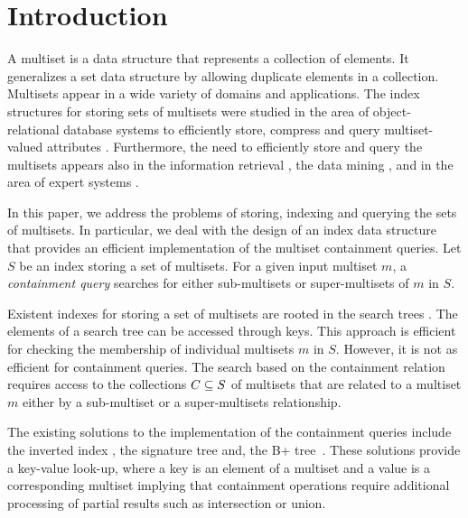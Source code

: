 \section{Introduction} \label{c:introduction}
%
%
A multiset is a data structure that represents a collection of elements. It generalizes a set data structure by allowing duplicate elements in a collection. Multisets appear in a wide variety of domains and applications. The index structures for storing sets of multisets were studied in the area of object-relational database systems to efficiently store, compress and query multiset-valued attributes \cite{bouros2016set,gripon2012compressing,ross2004symmetric,steinruecken2015compressing}. Furthermore, the need to efficiently store and query the multisets appears also in the information retrieval \cite{manning2008introduction,baeza1999modern}, the data mining \cite{mannila1997}, and in the area of expert systems \cite{forgy1982,inbook}. 
%

In this paper, we address the problems of storing, indexing and querying the sets of multisets. In particular, we deal with the design of an index data structure that provides an efficient implementation of the multiset containment queries. Let $S$ be an index storing a set of multisets. For a given input multiset $m$, a \emph{containment query} searches for either sub-multisets or super-multisets of $m$ in $S$. 

Existent indexes for storing a set of multisets are rooted in the search trees \cite{corman2001}. The elements of a search tree can be accessed through keys. This approach is efficient for checking the membership of individual multisets $m$ in $S$. However, it is not as efficient for  containment queries. The search based on the containment relation requires access to the collections $C\subseteq\/S$ of multisets that are related to a multiset $m$ either by a sub-multiset or a super-multisets relationship. 

The existing solutions to the implementation of the containment queries include the inverted index \cite{zobel1992efficient,zobel1998inverted,broder2006indexing}, the signature tree \cite{tousidou2002sigstruc,yangjun2005stree,zobel1998inverted} and, the B+ tree~\cite{Helmer2003}. These solutions provide a key-value look-up, where a key is an element of a multiset and a value is a corresponding multiset implying that containment operations require additional processing of partial results such as intersection or union.

